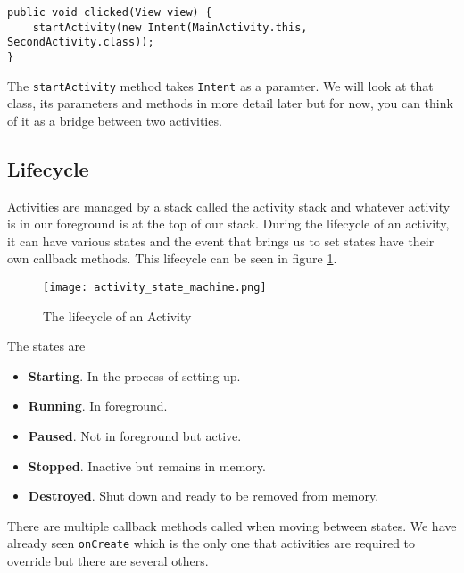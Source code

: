 \begin{lstlisting}[style=A_Java]
public void clicked(View view) {
    startActivity(new Intent(MainActivity.this, SecondActivity.class));
}	
\end{lstlisting}

The \texttt{startActivity} method takes \texttt{Intent} as a paramter. We will look at that class, its parameters and methods in more detail later but for now, you can think of it as a bridge between two activities. 

\subsection{Lifecycle}
Activities are managed by a stack called the activity stack and whatever activity is in our foreground is at the top of our stack. During the lifecycle of an activity, it can have various states and the event that brings us to set states have their own callback methods. This lifecycle can be seen in figure \ref{fig:actlife}.

\begin{figure}[H]
\centering
\texttt{[image: activity\_state\_machine.png]}
\caption{The lifecycle of an Activity}
\label{fig:actlife}
\end{figure}

The states are
\begin{itemize}
	\item \textbf{Starting}. In the process of setting up.
	\item \textbf{Running}. In foreground.
	\item \textbf{Paused}. Not in foreground but active.
	\item \textbf{Stopped}. Inactive but remains in memory.
	\item \textbf{Destroyed}. Shut down and ready to be removed from memory.
\end{itemize}

There are multiple callback methods called when moving between states. We have already seen \texttt{onCreate} which is the only one that activities are required to override but there are several others.

